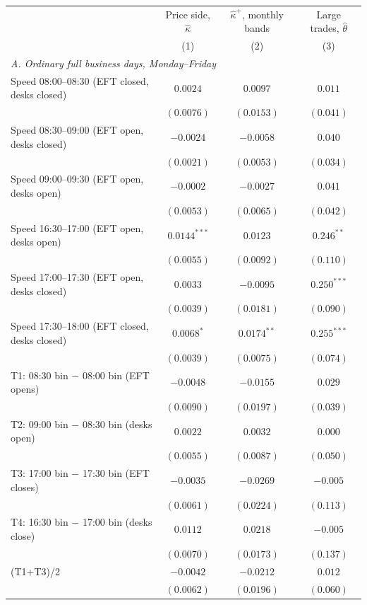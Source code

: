 \begin{tabular}{lccc}
\toprule
 & Price side, $\hat\kappa$ & $\hat\kappa^+$, monthly bands & Large trades, $\hat\theta$ \\
 & (1) & (2) & (3) \\
\midrule
\multicolumn{4}{l}{\emph{A. Ordinary full business days, Monday--Friday}} \\
Speed 08:00--08:30 (EFT closed, desks closed) & $0.0024$ & $0.0097$ & $0.011$ \\
 & $(0.0076)$ & $(0.0153)$ & $(0.041)$ \\
Speed 08:30--09:00 (EFT open, desks closed) & $-0.0024$ & $-0.0058$ & $0.040$ \\
 & $(0.0021)$ & $(0.0053)$ & $(0.034)$ \\
Speed 09:00--09:30 (EFT open, desks open) & $-0.0002$ & $-0.0027$ & $0.041$ \\
 & $(0.0053)$ & $(0.0065)$ & $(0.042)$ \\
Speed 16:30--17:00 (EFT open, desks open) & $0.0144^{***}$ & $0.0123$ & $0.246^{**}$ \\
 & $(0.0055)$ & $(0.0092)$ & $(0.110)$ \\
Speed 17:00--17:30 (EFT open, desks closed) & $0.0033$ & $-0.0095$ & $0.250^{***}$ \\
 & $(0.0039)$ & $(0.0181)$ & $(0.090)$ \\
Speed 17:30--18:00 (EFT closed, desks closed) & $0.0068^{*}$ & $0.0174^{**}$ & $0.255^{***}$ \\
 & $(0.0039)$ & $(0.0075)$ & $(0.074)$ \\
\addlinespace
T1: 08:30 bin $-$ 08:00 bin (EFT opens) & $-0.0048$ & $-0.0155$ & $0.029$ \\
 & $(0.0090)$ & $(0.0197)$ & $(0.039)$ \\
T2: 09:00 bin $-$ 08:30 bin (desks open) & $0.0022$ & $0.0032$ & $0.000$ \\
 & $(0.0055)$ & $(0.0087)$ & $(0.050)$ \\
T3: 17:00 bin $-$ 17:30 bin (EFT closes) & $-0.0035$ & $-0.0269$ & $-0.005$ \\
 & $(0.0061)$ & $(0.0224)$ & $(0.113)$ \\
T4: 16:30 bin $-$ 17:00 bin (desks close) & $0.0112$ & $0.0218$ & $-0.005$ \\
 & $(0.0070)$ & $(0.0173)$ & $(0.137)$ \\
(T1+T3)/2 & $-0.0042$ & $-0.0212$ & $0.012$ \\
 & $(0.0062)$ & $(0.0196)$ & $(0.060)$ \\

\end{tabular}
